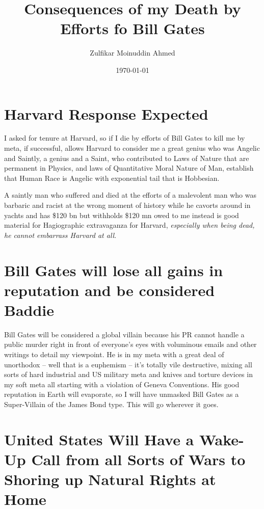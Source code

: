 \documentclass{amsart}
\title{Consequences of my Death by Efforts fo Bill Gates}
\author{Zulfikar Moinuddin Ahmed}
\date{\today}
\begin{document}
\maketitle

\section{Harvard Response Expected}

I asked for tenure at Harvard, so if I die by efforts of Bill Gates to kill me by meta, if successful, allows Harvard to consider me a great genius who was Angelic and Saintly, a genius and a Saint, who contributed to Laws of Nature that are permanent in Physics, and laws of Quantitative Moral Nature of Man, establish that Human Race is Angelic with exponential tail that is Hobbesian.

A saintly man who suffered and died at the efforts of a malevolent man who was barbaric and racist at the wrong moment of history while he cavorts around in yachts and has \$120 bn but withholds \$120 mn owed to me instead is good material for Hagiographic extravaganza for Harvard, {\em especially when being dead, he cannot embarrass Harvard at all}.  

\section{Bill Gates will lose all gains in reputation and be considered Baddie}

Bill Gates will be considered a global villain because his PR cannot handle a public murder right in front of everyone's eyes with voluminous emails and other writings to detail my viewpoint.  He is in my meta with a great deal of unorthodox -- well that is a euphemism -- it's totally vile destructive, mixing all sorts of hard industrial and US military meta and knives and torture devices in my soft meta all starting with a violation of Geneva Conventions.  His good reputation in Earth will evaporate, so I will have unmasked Bill Gates as a Super-Villain of the James Bond type.  This will go wherever it goes.

\section{United States Will Have a Wake-Up Call from all Sorts of Wars to Shoring up Natural Rights at Home}
\end{document}
